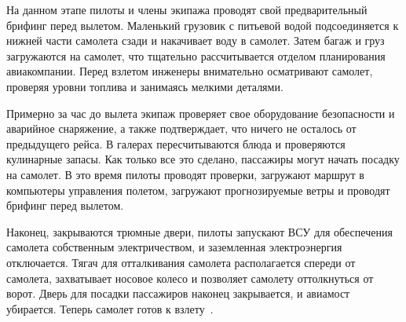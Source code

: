 На данном этапе пилоты и члены экипажа проводят свой предварительный брифинг перед вылетом.
Маленький грузовик с питьевой водой подсоединяется к нижней части самолета сзади и накачивает воду в самолет.
Затем багаж и груз загружаются на самолет, что тщательно рассчитывается отделом планирования авиакомпании.
Перед взлетом инженеры внимательно осматривают самолет, проверяя уровни топлива и занимаясь мелкими деталями.

Примерно за час до вылета экипаж проверяет свое оборудование безопасности и аварийное снаряжение, а также подтверждает, что ничего не осталось от предыдущего рейса.
В галерах пересчитываются блюда и проверяются кулинарные запасы.
Как только все это сделано, пассажиры могут начать посадку на самолет.
В это время пилоты проводят проверки, загружают маршрут в компьютеры управления полетом, загружают прогнозируемые ветры и проводят брифинг перед вылетом.

Наконец, закрываются трюмные двери, пилоты запускают ВСУ для обеспечения самолета собственным электричеством, и заземленная электроэнергия отключается.
Тягач для отталкивания самолета располагается спереди от самолета, захватывает носовое колесо и позволяет самолету оттолкнуться от ворот.
Дверь для посадки пассажиров наконец закрывается, и авиамост убирается.
Теперь самолет готов к взлету~\cite{aircraft-trt}.



